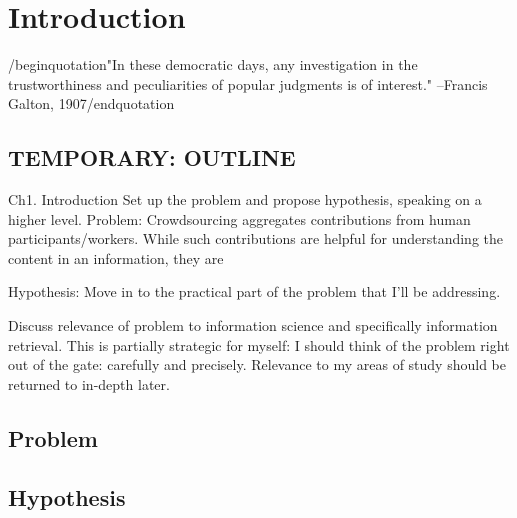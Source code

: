 \chapter{Introduction}
/begin{quotation}"In these democratic days, any investigation in the trustworthiness and peculiarities of popular judgments is of interest."
--Francis Galton, 1907/end{quotation}

\section{TEMPORARY: OUTLINE}
Ch1. Introduction
Set up the problem and propose hypothesis, speaking on a higher level.
Problem: Crowdsourcing aggregates contributions from human participants/workers. While such contributions are helpful for understanding the content in an information, they are 

Hypothesis:
Move in to the practical part of the problem that I'll be addressing.

Discuss relevance of problem to information science and specifically information retrieval.
This is partially strategic for myself: I should think of the problem right out of the gate: carefully and precisely. 
Relevance to my areas of study should be returned to in-depth later.

\section{Problem}
\section{Hypothesis}
\section{}
